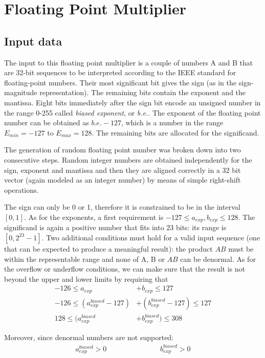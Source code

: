 \chapter{Floating Point Multiplier}

\section{Input data}
The input to this floating point multiplier is a couple of numbers A and B that are 32-bit sequences to be interpreted according to the IEEE standard for floating-point numbers. Their most significant bit gives the sign (as in the sign-magnitude representation). The remaining bits contain the exponent and the mantissa. Eight bits immediately after the sign bit encode an unsigned number in the range 0-255 called \textit{biased exponent}, or \textit{b.e.}. The exponent of the floating point number can be obtained as $\textit{b.e.} - 127$, which is a number in the range $E_{min} = -127$ to $E_{max}=128$.
The remaining bits are allocated for the significand.

 The generation of random floating point number was broken down into two consecutive steps. Random integer  numbers are obtained independently for the sign, exponent and mantissa and then they are aligned correctly in a 32 bit vector (again modeled as an integer number) by means of simple right-shift operations.
 
 The sign can only be 0 or 1, therefore it is constrained to be in the interval $[0,1]$. As for the exponents, a first requirement is $-127 \leq a_{exp}, b_{exp} \leq 128$. The significand is again a positive number that fits into 23 bits: its range is $[0, 2^{23}-1]$.
 Two additional conditions must hold for a valid input sequence (one that can be expected to produce a meaningful result): the product $AB$ must be within the representable range and none of A, B or $AB$ can be denormal. As for the overflow or underflow conditions, we can make sure that the result is not beyond the upper and lower limits by requiring that
 \begin{align*}
-126 \leq a_{exp} &+ b_{exp} \leq 127\\
-126 \leq (a_{exp}^{biased} - 127) &+ (b_{exp}^{biased} - 127) \leq 127 \\
128 \leq(a_{exp}^{biased} &+ b_{exp}^{biased}) \leq 308
 \end{align*}
 
Moreover, since denormal numbers are not supported:
\begin{align*}
a_{exp}^{biased} > 0\,\hspace{3cm}\, b_{exp}^{biased} > 0
\end{align*}

